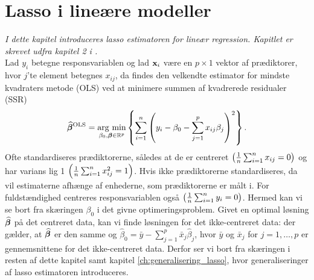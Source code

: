 \chapter{Lasso i lineære modeller} \label{ch:lasso}
\textit{I dette kapitel introduceres lasso estimatoren for lineær regression. 
Kapitlet er skrevet udfra kapitel 2 i \citep{hastie}.
} \\[4mm]
%
Lad \(y_i\) betegne responsvariablen og lad \(\mathbf{x}_i\) være en \(p \times 1\) vektor af prædiktorer, hvor \(j\)'te element betegnes \(x_{ij}\), da findes den velkendte estimator for mindste kvadraters metode (OLS) ved at minimere summen af kvadrerede residualer (SSR)
\begin{align}
\widehat{\tbeta}^\text{OLS} = \argmin_{\beta_0, \tbeta \in \R^p} \cbr{\sum_{i=1}^n \del{y_i - \beta_0 - \sum_{j=1}^p x_{ij} \beta_j}^2}. \label{eq:OLS}
\end{align}
%
Ofte standardiseres prædiktorerne, således at de er centreret \( \del{\frac{1}{n} \sum_{i=1}^n x_{ij} = 0}\) og har varians lig 1 \( \del{\frac{1}{n} \sum_{i=1}^n x_{ij}^2=1}\).
Hvis ikke prædiktorerne standardiseres, da vil estimaterne afhænge af enhederne, som prædiktorerne er målt i.
For fuldstændighed centreres responsvariablen også \( \del{\frac{1}{n} \sum_{i=1}^n y_{i} = 0} \).
Hermed kan vi se bort fra skæringen $\beta_0$ i det givne optimeringsproblem.
Givet en optimal løsning \(\widehat{\boldsymbol{\beta}}\) på det centreret data, kan vi finde løsningen for det ikke-centreret data: der gælder, at \(\widehat{\boldsymbol{\beta}}\) er den samme og 
\(\widehat{\beta}_0 = \bar{y} - \sum_{j=1}^p \bar{x}_j \widehat{\beta}_j\), hvor \(\bar{y}\) og \(\bar{x}_j \) for \(j=1, \ldots, p\) er gennemsnittene for det ikke-centreret data.
Derfor ser vi bort fra skæringen i resten af dette kapitel samt kapitel \ref{ch:generalisering_lasso}, hvor generaliseringer af lasso estimatoren introduceres.

